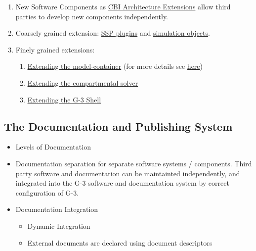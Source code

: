 \documentclass[12pt]{article}
\begin{document}
\begin{enumerate}
\item New Software Components as
  \href{../genesis-addto-component-developerpackage/genesis-addto-component-developerpackage.tex}{CBI
    Architecture Extensions} allow third parties to develop new
  components independently.
\item Coarsely grained extension:
  \href{../genesis-add-feature-ssp/genesis-add-feature-ssp.tex}{SSP
    plugins} and
  \href{../genesis-add-object-solver/genesis-add-object-solver.tex}{simulation
    objects}.
\item Finely grained extensions:
  \begin{enumerate}
  \item
    \href{../genesis-extend-model-container/genesis-extend-model-container.tex}{Extending
      the model-container} (for more details see
    \href{../genesis-extend-model-container-detail/genesis-extend-model-container-detail.tex}{here})
  \item
    \href{../genesis-add-object-solver/genesis-add-object-solver.tex}{Extending the compartmental solver}
  \item \href{../genesis-add-object-solver/genesis-add-object-solver.tex}{Extending the G-3 Shell}
  \end{enumerate}
\end{enumerate}



\subsection{The Documentation and Publishing System}

\begin{itemize}
\item Levels of Documentation
\item Documentation separation for separate software systems /
  components.  Third party software and documentation can be
  maintainted independently, and integrated into the G-3 software and
  documentation system by correct configuration of G-3.
\item Documentation Integration
  \begin{itemize}
  \item Dynamic Integration
  \item External documents are declared using document descriptors
  \end{itemize}
\end{itemize}
\end{document}
